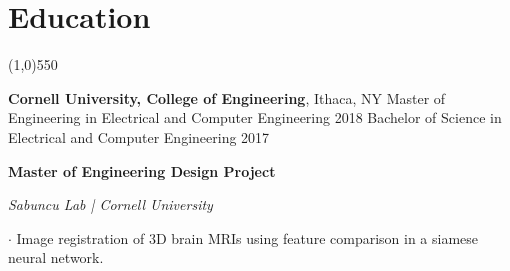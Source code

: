 \documentclass[11pt]{article} %
\begin{document}
	\section*{Education}
	\vspace{-7ex}
	\begin{center}
    \line(1,0){550}
    \end{center}
    \vspace{-1ex}
    {\large\textbf{Cornell University, College of Engineering}}, Ithaca, NY \newline
	Master of Engineering in Electrical and Computer Engineering \hfill 2018\newline
	Bachelor of Science in Electrical and Computer Engineering%
	\hfill 2017 \par %
	\vspace{+1ex}
	{\large\textbf{Master of Engineering Design Project}} \par 
		\textit{Sabuncu Lab | Cornell University}\vspace{+1ex} \par
		$\boldsymbol{\cdot}$ Image registration of 3D brain MRIs using feature comparison in a siamese neural network.
	\vspace{-2ex}
\end{document}
